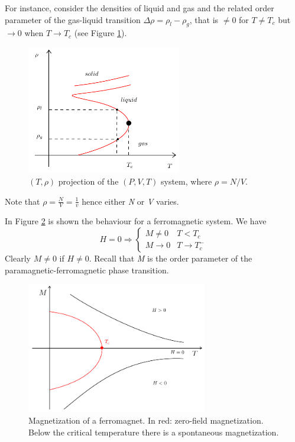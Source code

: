 \documentclass[../main/main.tex]{subfiles}
\begin{document}
For instance, consider the densities of liquid and gas and the related order parameter of the gas-liquid transition \( \Delta \rho = \rho _{l} - \rho _{g} \), that is \( \neq 0 \) for \( T \neq T_c \) but \( \rightarrow 0 \) when \( T \rightarrow T_c \) (see Figure \ref{fig:3_2}).

\begin{figure}[h!]
\centering
\includegraphics[width=0.6\textwidth]{../lessons/3_image/3.pdf}
\caption{\label{fig:3_2} \( (T,\rho ) \) projection of the \( (P,V,T) \) system, where \( \rho = N/V \). }
\end{figure}

\begin{remark}
Note that \( \rho = \frac{N}{V} = \frac{1}{v} \) hence either \emph{N} or \emph{V} varies.
\end{remark}


In Figure \ref{fig:3_3} is shown the behaviour for a ferromagnetic system. We have 
\begin{equation*}
  H= 0 \Rightarrow \begin{cases}
    M \neq 0 & T < T_c   \\
    M \rightarrow 0 & T \rightarrow T_c^-
\end{cases}
\end{equation*}
Clearly \( M \neq 0 \) if \( H \neq 0 \). Recall that \emph{M} is the order parameter of the paramagnetic-ferromagnetic phase transition. 
\begin{figure}[h!]
\centering
\includegraphics[width=0.7\textwidth]{../lessons/3_image/5.pdf}
\caption{\label{fig:3_3} Magnetization of a ferromagnet. In red: zero-field magnetization. Below the critical temperature there is a spontaneous magnetization.}
\end{figure}
\end{document}
